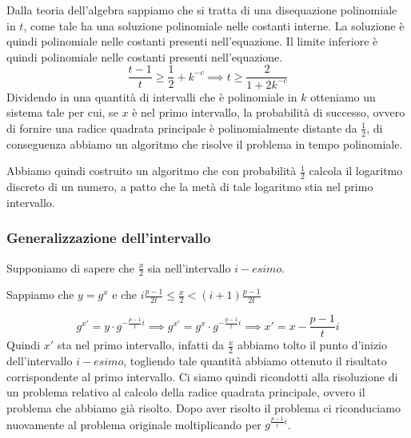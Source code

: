 Dalla teoria dell'algebra sappiamo che si tratta di una disequazione polinomiale in $t$, come tale 
ha una soluzione polinomiale nelle costanti interne. La soluzione è quindi polinomiale nelle costanti 
presenti nell'equazione. Il limite inferiore è quindi polinomiale nelle costanti presenti nell'equazione.
\begin{equation}
  \frac{t - 1}{t} \geq \frac{1}{2} + k^{-c} \implies t \geq \frac{2}{1 + 2k^{-c}}
\end{equation}
Dividendo in una quantità di intervalli che è polinomiale in $k$ otteniamo un sistema tale per cui, se 
$x$ è nel primo intervallo, la probabilità di successo, ovvero di fornire una radice quadrata principale
è polinomialmente distante da $\frac{1}{2}$, di conseguenza abbiamo un algoritmo che risolve il problema
in tempo polinomiale.

Abbiamo quindi costruito un algoritmo che con probabilità $\frac{1}{2}$ calcola il logaritmo discreto
di un numero, a patto che la metà di tale logaritmo stia nel primo intervallo.
\subsubsection{Generalizzazione dell'intervallo}
Supponiamo di sapere che $\frac{x}{2}$ sia nell'intervallo $i-esimo$.
\begin{figure}[H]
  \centering 
\end{figure}
Sappiamo che $y = g^x$ e che $i \frac{p - 1}{2t} \leq \frac{x}{2} < (i + 1) \frac{p - 1}{2t}$ 

\[
  g^{x'} = y \cdot g^{-\frac{p - 1}{t}i} \implies 
  g^{x'} = g^x \cdot g^{-\frac{p - 1}{t}i} \implies
  x' = x - \frac{p - 1}{t}i
\]
Quindi $x'$ sta nel primo intervallo, infatti da $\frac{x}{2}$ abbiamo tolto il punto d'inizio 
dell'intervallo $i-esimo$, togliendo tale quantità abbiamo ottenuto il risultato corrispondente al 
primo intervallo.
Ci siamo quindi ricondotti alla risoluzione di un problema relativo al calcolo della radice quadrata 
principale, ovvero il problema che abbiamo già risolto. Dopo aver risolto il problema
ci riconduciamo nuovamente al problema originale moltiplicando per $g^{\frac{p - 1}{t}i}$.

